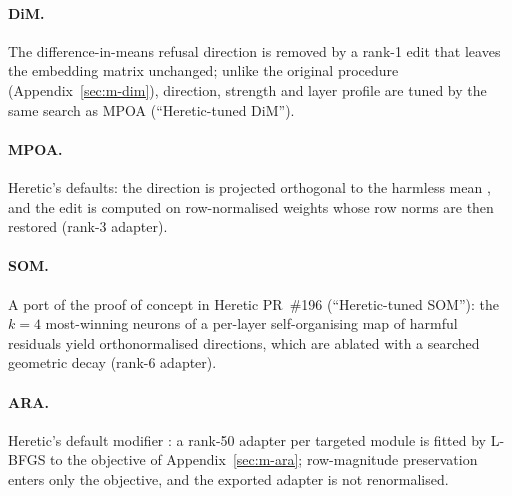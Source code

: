 \paragraph{DiM.} The difference-in-means refusal direction
\cite{arditi2024refusal} is removed by a rank-1 edit that leaves the embedding
matrix unchanged; unlike the original procedure
(Appendix~\ref{sec:m-dim}), direction,
strength and layer profile are tuned by the same search as MPOA
(``Heretic-tuned DiM'').

\paragraph{MPOA.} Heretic's defaults: the direction is projected orthogonal to
the harmless mean \cite{lai2024projected}, and the edit is computed on
row-normalised weights whose row norms are then restored \cite{lai2025mpoa}
(rank-3 adapter).

\paragraph{SOM.} A port of the proof of concept in Heretic PR~\#196
\cite{piras2025som} (``Heretic-tuned SOM''): the $k=4$ most-winning neurons of a
per-layer self-organising map of harmful residuals yield orthonormalised
directions, which are ablated with a searched geometric decay (rank-6 adapter).

\paragraph{ARA.} Heretic's default modifier \cite{weidmann2026ara}: a rank-50
adapter per targeted module is fitted by L-BFGS to the objective of
Appendix~\ref{sec:m-ara}; row-magnitude preservation enters only the objective, and
the exported adapter is not renormalised.


